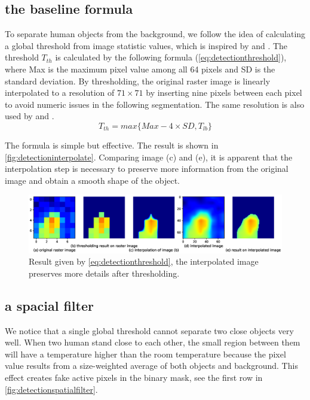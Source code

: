 \subsection{the baseline formula}
To separate human objects from the background, we follow the idea of calculating a global threshold from image statistic values, which is inspired by \cite{virtualtrack} and \cite{jeong2014probabilistic}. The threshold $T_{th}$ is calculated by the following formula (\autoref{eq:detectionthreshold}), where Max is the maximum pixel value among all 64 pixels and SD is the standard deviation. By thresholding, the original raster image is linearly interpolated to a resolution of $71\times71$ by inserting nine pixels between each pixel to avoid numeric issues in the following segmentation. The same resolution is also used by \cite{virtualtrack} and \cite{mika}.
\begin{equation}\label{eq:detectionthreshold}
  T_{th} = max\{Max - 4\times SD, T_{lb}\}
\end{equation}

The formula is simple but effective. The result is shown in \autoref{fig:detectioninterpolate}. Comparing image (c) and (e), it is apparent that the interpolation step is necessary to preserve more information from the original image and obtain a smooth shape of the object.
\begin{figure}
  \centering
  \includegraphics[width=\textwidth]{figures/detect_interpolate.eps}
  \caption{Result given by \autoref{eq:detectionthreshold}, the interpolated image preserves more details after thresholding.}\label{fig:detectioninterpolate}
\end{figure}

\subsection{a spacial filter}
We notice that a single global threshold cannot separate two close objects very well. When two human stand close to each other, the small region between them will have a temperature higher than the room temperature because the pixel value results from a size-weighted average of both objects and background. This effect creates fake active pixels in the binary mask, see the first row in \autoref{fig:detectionspatialfilter}.

